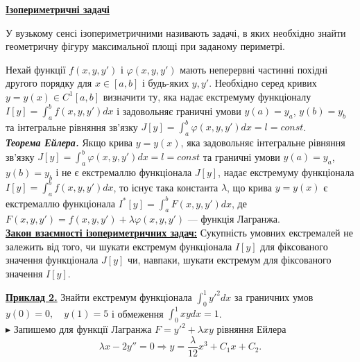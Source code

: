 \documentclass[a4paper]{article}
\begin{document}
	\begin{center}
		\underline{\textbf{Ізопериметричні задачі}}
	\end{center}
	
	У вузькому сенсі ізопериметричними називають задачі, в яких необхідно знайти геометричну фігуру
	максимальної площі при заданому периметрі.
	
	Нехай функції $f(x, y, y')$ і $\varphi(x, y, y')$
	мають неперервні частинні похідні другого порядку для $x \in [a,b]$ і будь-яких $y, y'$.
	Необхідно серед кривих $y = y(x) \in C^{1}[a, b]$ визначити ту, яка надає екстремуму функціоналу
	$I[y] = \int_{a}^{b} f(x, y, y')dx$
	і задовольняє граничні умови $y(a) = y_a$, $y(b) = y_b$
	та інтегральне рівняння зв’язку $J[y] = \int_{a}^{b} \varphi(x, y, y')dx = l = const$.\\
	\textit{\textbf{Теорема Ейлера.}}
		Якщо крива $y = y(x)$, яка задовольняє інтегральне рівняння зв’язку
		$J[y] = \int_{a}^{b} \varphi(x, y, y')dx = l = const$
		та граничні умови  $y(a) = y_a$, $y(b) = y_b$ і не є екстремаллю функціонала $J[y]$,
		надає екстремуму функціонала $I[y] = \int_{a}^{b} f(x, y, y')dx$,
		то існує така константа $\lambda$, що крива $y = y(x)$
		є екстремаллю функціонала $I^*[y] = \int_{a}^{b} F(x, y, y')dx$,
		де $F(x, y, y') = f(x, y, y') + \lambda \varphi(x, y , y')$ --- функція Лагранжа.\\
	\underline{\textbf{Закон взаємності ізопериметричних задач:}} Сукупність умовних екстремалей не залежить від того, чи шукати екстремум функціонала $I[y]$ для фіксованого значення функціонала $J[y]$ чи, навпаки, шукати екстремум для фіксованого значення $I[y]$.

	\underline{\textbf{Приклад 2.}} Знайти екстремум функціонала $\int_{0}^{1} {y'}^{2}dx$ за граничних умов
	$y(0) = 0,\quad y(1) = 5$ і обмеження $\int_{0}^{1} xydx = 1$.\\
	$\blacktriangleright$ Запишемо для функції Лагранжа $F = {y'}^{2} + \lambda x y $ рівняння Ейлера
	$$\lambda x - 2y'' = 0 \Rightarrow y = \frac{\lambda}{12} x^3 + C_1x + C_2.$$
\end{document}
